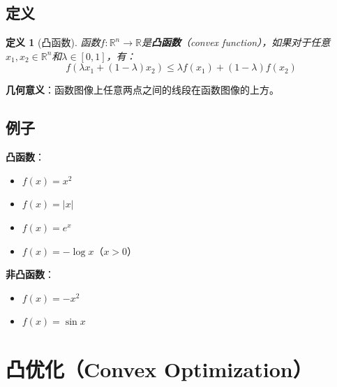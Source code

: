 \documentclass[12pt,a4paper]{article}
\newtheorem{definition}{定义}
\begin{document}
\subsection{定义}

\begin{definition}[凸函数]
函数$f: \mathbb{R}^n \to \mathbb{R}$是\textbf{凸函数}（convex function），如果对于任意$x_1, x_2 \in \mathbb{R}^n$和$\lambda \in [0, 1]$，有：
\begin{equation}
f(\lambda x_1 + (1-\lambda) x_2) \leq \lambda f(x_1) + (1-\lambda) f(x_2)
\label{eq:convex_function}
\end{equation}
\end{definition}

\textbf{几何意义}：函数图像上任意两点之间的线段在函数图像的上方。

\begin{center}
\end{center}

\subsection{例子}

\textbf{凸函数}：
\begin{itemize}
\item $f(x) = x^2$
\item $f(x) = |x|$
\item $f(x) = e^x$
\item $f(x) = -\log x$（$x > 0$）
\end{itemize}

\textbf{非凸函数}：
\begin{itemize}
\item $f(x) = -x^2$
\item $f(x) = \sin x$
\end{itemize}

\section{凸优化（Convex Optimization）}
\end{document}
